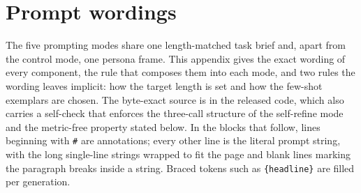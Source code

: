 \documentclass{article}
\begin{document}



\appendix

\section{Prompt wordings}
\label{sec:prompts}

The five prompting modes share one length-matched task brief and, apart from the control mode,
one persona frame. This appendix gives the exact wording of every component, the rule that
composes them into each mode, and two rules the wording leaves implicit: how the target length is
set and how the few-shot exemplars are chosen. The byte-exact source is 
in the released code, which also carries a self-check that enforces the three-call structure of
the self-refine mode and the metric-free property stated below. In the blocks that follow, lines
beginning with \texttt{\#} are annotations; every other line is the literal prompt string, with
the long single-line strings wrapped to fit the page and blank lines marking the paragraph breaks
inside a string. Braced tokens such as \texttt{\{headline\}} are filled per generation.
\end{document}
